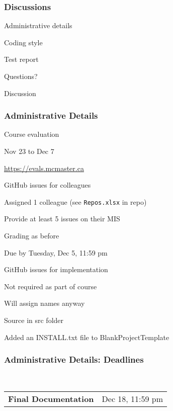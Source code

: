 \documentclass[t,12pt,numbers,fleqn]{beamer}
\begin{document}



\begin{frame}
\frametitle{Discussions}

\bi
\item Administrative details
\item Coding style
\item Test report
\item Questions?
\item Discussion
\ei

\end{frame}


\begin{frame}
\frametitle{Administrative Details}

\bi
\item Course evaluation
\bi
\item Nov 23 to Dec 7
\item \url{https://evals.mcmaster.ca}
\ei
\item GitHub issues for colleagues
\bi
\item Assigned 1 colleague (see \texttt{Repos.xlsx} in repo)
\item Provide at least 5 issues on their MIS
\item Grading as before
\item Due by Tuesday, Dec 5, 11:59 pm
\ei
\item GitHub issues for implementation
\bi
\item Not required as part of course
\item Will assign names anyway
\ei
\item Source in src folder
\item Added an INSTALL.txt file to BlankProjectTemplate
\ei

\end{frame}


\begin{frame}
\frametitle{Administrative Details: Deadlines}
~\newline
\begin{tabular}{l l}
\textbf{Final Documentation} & Dec 18, 11:59 pm\\
\end {tabular}

\end{frame}
\end{document}
